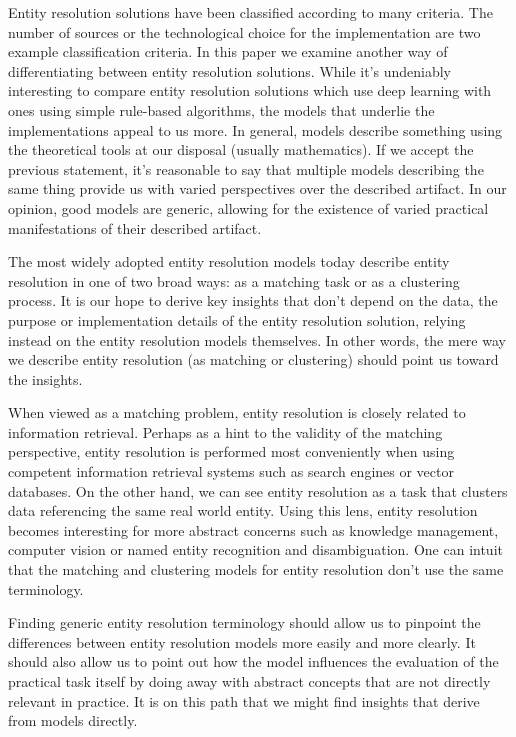 \documentclass[journal]{IEEEtran}
\begin{document}
    Entity resolution solutions have been classified according to many criteria.
    The number of sources or the technological choice for the implementation are
    two example classification criteria.
    In this paper we examine another way of differentiating between entity
    resolution solutions.
    While it's undeniably interesting to compare entity resolution solutions
    which use deep learning with ones using simple rule-based algorithms, the
    models that underlie the implementations appeal to us more.
    In general, models describe something using the theoretical tools at our
    disposal (usually mathematics).
    If we accept the previous statement, it's reasonable to say that multiple
    models describing the same thing provide us with varied perspectives over
    the described artifact.
    In our opinion, good models are generic, allowing for the existence of
    varied practical manifestations of their described artifact.
    
    The most widely adopted entity resolution models today describe entity
    resolution in one of two broad ways: as a matching task or as a clustering
    process.
    It is our hope to derive key insights that don't depend on the data, the
    purpose or implementation details of the entity resolution solution, relying
    instead on the entity resolution models themselves.
    In other words, the mere way we describe entity resolution (as matching or
    clustering) should point us toward the insights.

    When viewed as a matching problem, entity resolution is closely related to
    information retrieval.
    Perhaps as a hint to the validity of the matching perspective, entity
    resolution is performed most conveniently when using competent information
    retrieval systems such as search engines or vector databases.
    On the other hand, we can see entity resolution as a task that clusters data
    referencing the same real world entity.
    Using this lens, entity resolution becomes interesting for more abstract
    concerns such as knowledge management, computer vision or named entity
    recognition and disambiguation.
    One can intuit that the matching and clustering models for entity resolution
    don't use the same terminology.

    Finding generic entity resolution terminology should allow us to pinpoint
    the differences between entity resolution models more easily and more
    clearly.
    It should also allow us to point out how the model influences the evaluation
    of the practical task itself by doing away with abstract concepts that are
    not directly relevant in practice.
    It is on this path that we might find insights that derive from models
    directly.
    
\end{document}
